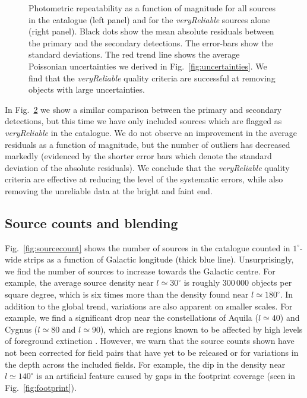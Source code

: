\documentclass[useAMS,usenatbib]{mn2e}
\begin{document}
\begin{figure}
\begin{subfigure}[b]{0.45\linewidth}
\caption{}
\label{fig:pairmag_reliable}
\end{subfigure}
\caption{Photometric repeatability as a function of magnitude
         for all sources in the catalogue (left panel)
         and for the \emph{veryReliable} sources alone (right panel).
         Black dots show the mean absolute residuals
         between the primary and the secondary detections.
         The error-bars show the standard deviations.
         The red trend line shows the average Poissonian uncertainties
         we derived in Fig.~\ref{fig:uncertainties}.
         We find that the \emph{veryReliable} quality criteria are successful
         at removing objects with large uncertainties.
    }
\end{figure}

In Fig.~\ref{fig:pairmag_reliable} we show 
a similar comparison between the primary and secondary detections,
but this time we have only included sources which are flagged
as \emph{veryReliable} in the catalogue.
We do not observe an improvement in the average residuals as a function of magnitude,
but the number of outliers has decreased markedly
(evidenced by the shorter error bars which denote the standard deviation of the absolute residuals).
We conclude that the \emph{veryReliable} quality criteria are effective
at reducing the level of the systematic errors,
while also removing the unreliable data at the bright and faint end.

\subsection{Source counts and blending}
\label{sec:densities}

Fig.~\ref{fig:sourcecount} shows the number of sources
in the catalogue counted in $1^\circ$-wide strips
as a function of Galactic longitude (thick blue line).	
Unsurprisingly, we find the number of sources
to increase towards the Galactic centre.
For example, the average source density near $l\simeq 30^\circ$
is roughly 300\,000 objects per square degree,
which is six times more than the density
found near $l\simeq 180^\circ$.
In addition to the global trend,
variations are also apparent on smaller scales.
For example, we find a significant drop near the constellations 
of Aquila ($l\simeq40$) and Cygnus ($l\simeq80$ and $l\simeq90$),
which are regions known to be affected
by high levels of foreground extinction
\citep[the extremities of `the Great Rift', e.g.][]{BokBok}.
However, we warn that the source counts shown 
have not been corrected for field pairs that have yet
to be released or for variations in the depth across the included fields.
For example, the dip in the density near $l\simeq140^\circ$
is an artificial feature caused by gaps
in the footprint coverage (seen in Fig.~\ref{fig:footprint}).
\end{document}
